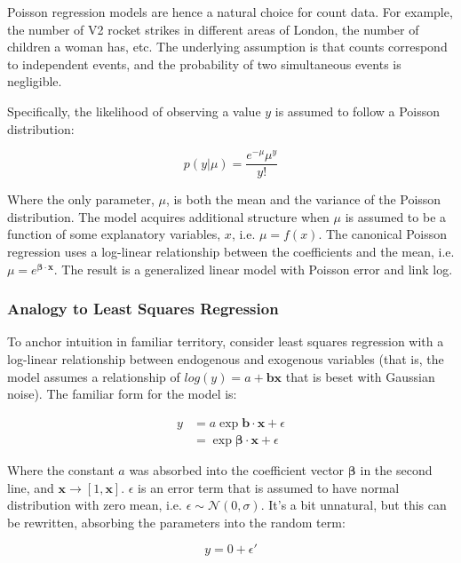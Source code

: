 Poisson regression models are hence a natural choice for count data. For example, the number of V2 rocket strikes in different areas of London, the number of children a woman has, etc. The underlying assumption is that counts correspond to independent events, and the probability of two simultaneous events is negligible. 

Specifically, the likelihood of observing a value $y$ is assumed to follow a Poisson distribution:

\begin{equation}
p(y|\mu) = \frac{e^{-\mu} \mu^{y}}{y!}
\end{equation}

Where the only parameter, $\mu$, is both the mean and the variance of the Poisson distribution. The model acquires additional structure when $\mu$ is assumed to be a function of some explanatory variables, $x$, i.e. $\mu = f(x)$. The canonical Poisson regression uses a log-linear relationship between the coefficients and the mean, i.e. $\mu = e^{\mathbf{\beta \cdot x}}$. The result is a generalized linear model with Poisson error and link log.


\subsubsection{Analogy to Least Squares Regression}
To anchor intuition in familiar territory, consider least squares regression with a log-linear relationship between endogenous and exogenous variables (that is, the model assumes a relationship of $log(y)=a + \mathbf{bx}$ that is beset with Gaussian noise). The familiar form for the model is:

\begin{equation}
\begin{array}{rl}
y &= a\exp{\mathbf{b \cdot x}} + \epsilon \\
&= \exp\mathbf{\beta \cdot x} + \epsilon
\end{array}
\end{equation}

Where the constant $a$ was absorbed into the coefficient vector $\mathbf{\beta}$ in the second line, and $\mathbf{x} \rightarrow [1,\mathbf{x}]$. $\epsilon$ is an error term that is assumed to have normal distribution with zero mean, i.e. $\epsilon \sim \mathscr{N}(0,\sigma)$. It's a bit unnatural, but this can be rewritten, absorbing the parameters into the random term:

\begin{equation}
y = 0 + \epsilon'
\end{equation}

